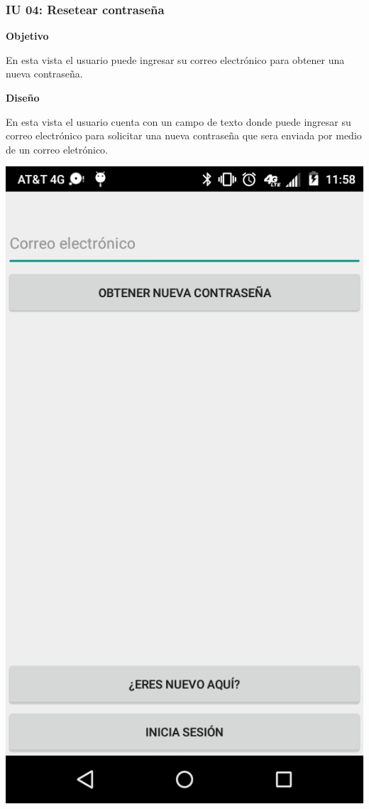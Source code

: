       \subsubsection{IU 04: Resetear contraseña} \label{iu04}
  \textbf{Objetivo} \par
  En esta vista el usuario puede ingresar su correo electrónico para obtener una nueva contraseña. \par
  \textbf{Diseño} \par
  En esta vista el usuario cuenta con un campo de texto donde puede ingresar su correo electrónico para solicitar una nueva contraseña que sera enviada por medio de un correo eletrónico.
    \begin{center}
      \includegraphics[scale=.2]{Capitulo3/img/gui/IU_Resetear_contrasena.png}
      \label{fig:iu04_fig}
    \end{center}
